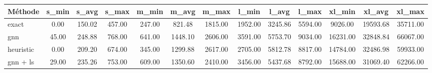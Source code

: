 \begin{tabular}{lcccccccccccc}
\toprule
Méthode & s_min & s_avg & s_max & m_min & m_avg & m_max & l_min & l_avg & l_max & xl_min & xl_avg & xl_max \\
\midrule
exact & 0.00 & 150.02 & 457.00 & 247.00 & 821.48 & 1815.00 & 1952.00 & 3245.86 & 5594.00 & 9026.00 & 19593.68 & 35711.00 \\
gnn & 45.00 & 248.88 & 768.00 & 641.00 & 1448.10 & 2606.00 & 3591.00 & 5753.70 & 9034.00 & 16231.00 & 32848.84 & 66067.00 \\
heuristic & 0.00 & 209.20 & 674.00 & 345.00 & 1299.88 & 2617.00 & 2705.00 & 5812.78 & 8817.00 & 14784.00 & 32486.98 & 59933.00 \\
gnn + ls & 29.00 & 235.26 & 753.00 & 609.00 & 1350.60 & 2410.00 & 3456.00 & 5437.68 & 8792.00 & 15688.00 & 31069.40 & 62266.00 \\
\bottomrule
\end{tabular}
